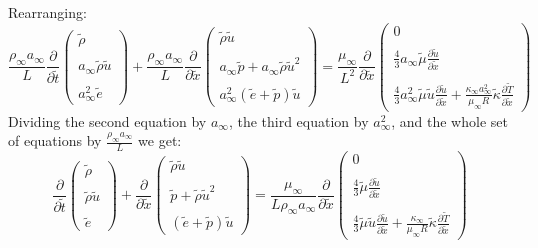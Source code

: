 \documentclass[11pt, a4paper]{article}
\newcommand{\parder}[2]{\frac{\partial {#1}}{\partial {#2}}}
\begin{document}
Rearranging:
\begin{equation}
    \frac{\rho_\infty a_\infty}{L}\parder{}{\tilde{t}}\begin{pmatrix}
        \tilde{\rho} \\\\
        a_\infty\tilde{\rho}\tilde{u} \\\\
        a_\infty^2\tilde{e}
    \end{pmatrix}+\frac{\rho_\infty a_\infty}{L}\parder{}{\tilde{x}}\begin{pmatrix}
        \tilde{\rho}\tilde{u} \\\\
        a_\infty\tilde{p}+a_\infty\tilde{\rho}\tilde{u}^2 \\\\
        a_\infty^2\left(\tilde{e}+\tilde{p}\right)\tilde{u}
    \end{pmatrix}=\frac{\mu_\infty}{L^2}\parder{}{\tilde{x}}\begin{pmatrix}
        0 \\\\
        \displaystyle\frac{4}{3}a_\infty\tilde{\mu} \parder{\tilde{u}}{\tilde{x}} \\\\
        \displaystyle\frac{4}{3}a_\infty^2\tilde{\mu}\tilde{u}\parder{\tilde{u}}{\tilde{x}}+\frac{\kappa_\infty a_\infty^2}{\mu_\infty R}\tilde{\kappa}\parder{\tilde{T}}{\tilde{x}}
    \end{pmatrix}
\end{equation}
Dividing the second equation by $a_\infty$, the third equation by $a_\infty^2$, and the whole set of equations by $\displaystyle\frac{\rho_\infty a_\infty}{L}$ we get:
\begin{equation}
    \parder{}{\tilde{t}}\begin{pmatrix}
        \tilde{\rho} \\\\
        \tilde{\rho}\tilde{u} \\\\
        \tilde{e}
    \end{pmatrix}+\parder{}{\tilde{x}}\begin{pmatrix}
        \tilde{\rho}\tilde{u} \\\\
        \tilde{p}+\tilde{\rho}\tilde{u}^2 \\\\
        \left(\tilde{e}+\tilde{p}\right)\tilde{u}
    \end{pmatrix}=\frac{\mu_\infty}{L\rho_\infty a_\infty}\parder{}{\tilde{x}}\begin{pmatrix}
        0 \\\\
        \displaystyle\frac{4}{3}\tilde{\mu} \parder{\tilde{u}}{\tilde{x}} \\\\
        \displaystyle\frac{4}{3}\tilde{\mu}\tilde{u}\parder{\tilde{u}}{\tilde{x}}+\frac{\kappa_\infty}{\mu_\infty R}\tilde{\kappa}\parder{\tilde{T}}{\tilde{x}}
    \end{pmatrix}
\end{equation}
\end{document}
